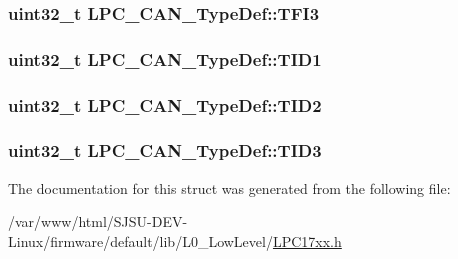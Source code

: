 \subsubsection[{\texorpdfstring{T\+F\+I3}{TFI3}}]{ uint32\+\_\+t L\+P\+C\+\_\+\+C\+A\+N\+\_\+\+Type\+Def\+::\+T\+F\+I3}\hypertarget{structLPC__CAN__TypeDef_a19178f6639ceb8596a96e66674c0d840}{}\label{structLPC__CAN__TypeDef_a19178f6639ceb8596a96e66674c0d840}
\subsubsection[{\texorpdfstring{T\+I\+D1}{TID1}}]{ uint32\+\_\+t L\+P\+C\+\_\+\+C\+A\+N\+\_\+\+Type\+Def\+::\+T\+I\+D1}\hypertarget{structLPC__CAN__TypeDef_ad941f092e33373988b99e82eb8da7b98}{}\label{structLPC__CAN__TypeDef_ad941f092e33373988b99e82eb8da7b98}
\subsubsection[{\texorpdfstring{T\+I\+D2}{TID2}}]{ uint32\+\_\+t L\+P\+C\+\_\+\+C\+A\+N\+\_\+\+Type\+Def\+::\+T\+I\+D2}\hypertarget{structLPC__CAN__TypeDef_aa5df91f305a251b272faf9ec198ec0e8}{}\label{structLPC__CAN__TypeDef_aa5df91f305a251b272faf9ec198ec0e8}
\subsubsection[{\texorpdfstring{T\+I\+D3}{TID3}}]{ uint32\+\_\+t L\+P\+C\+\_\+\+C\+A\+N\+\_\+\+Type\+Def\+::\+T\+I\+D3}\hypertarget{structLPC__CAN__TypeDef_a8ad7b5ae2f928f189fea5f021789e1e2}{}\label{structLPC__CAN__TypeDef_a8ad7b5ae2f928f189fea5f021789e1e2}


The documentation for this struct was generated from the following file\+:\begin{DoxyCompactItemize}
\item 
/var/www/html/\+S\+J\+S\+U-\/\+D\+E\+V-\/\+Linux/firmware/default/lib/\+L0\+\_\+\+Low\+Level/\hyperlink{LPC17xx_8h}{L\+P\+C17xx.\+h}\end{DoxyCompactItemize}
